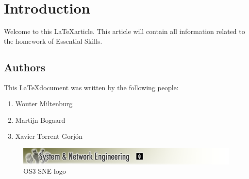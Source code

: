 \chapter{Introduction}
\label{chap:introduction}
Welcome to this \LaTeX article. This article will contain all information related to the homework of Essential Skills.

\section{Authors}
This \LaTeX document was written by the following people:
\begin{enumerate}
\item Wouter Miltenburg
\item Martijn Bogaard
\item Xavier Torrent Gorj\'on
\end{enumerate}


\begin{figure}[ht]
\includegraphics[width=15cm]{Chapters/00_intro_sne_logo.png}
\caption{OS3 SNE logo\protect\footnotemark}
\end{figure}

